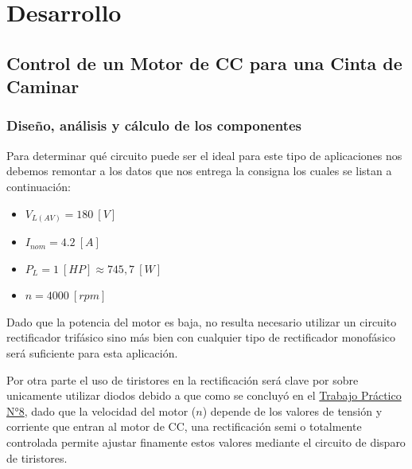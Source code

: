 \documentclass[12pt,a4paper]{article}
\begin{document}
\section{Desarrollo}
\subsection{Control de un Motor de CC para una Cinta de Caminar}
\subsubsection{Diseño, análisis y cálculo de los componentes}
Para determinar qué circuito puede ser el ideal para este tipo de aplicaciones nos debemos remontar a los datos que nos entrega la consigna los cuales se listan a continuación:
\begin{itemize}
    \item $V_{L(AV)} = 180 \ [V]$
    \item $I_{nom} = 4.2 \ [A]$
    \item $P_{L} = 1 \ [HP] \approx 745,7 \ [W]$
    \item $n = 4000 \ [rpm]$
\end{itemize}

Dado que la potencia del motor es baja, no resulta necesario utilizar un circuito rectificador trifásico sino más bien con cualquier tipo de rectificador monofásico será suficiente para esta aplicación. 

Por otra parte el uso de tiristores en la rectificación será clave por sobre unicamente utilizar diodos debido a que como se concluyó en el \href{https://github.com/ErnestMonja/Electronica-Industrial/blob/main/TPT8%20%20%20-%20Tiristores%20con%20Carga%20RLE%20y%20TCA785/Monja.TPT8.EI2026.pdf}{Trabajo Práctico N°8}, dado que la velocidad del motor ($n$) depende de los valores de tensión y corriente que entran al motor de CC, una rectificación semi o totalmente controlada permite ajustar finamente estos valores mediante el circuito de disparo de tiristores.
\end{document}
